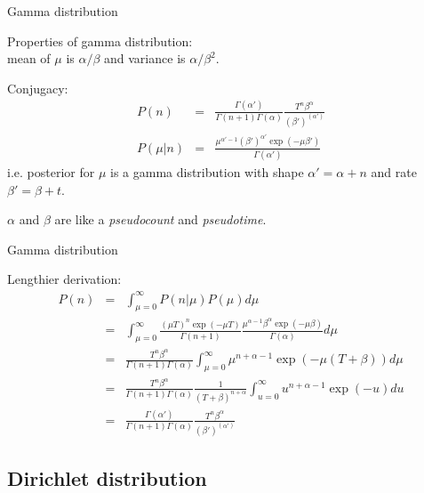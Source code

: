 \documentclass{beamer}
\begin{document}
\begin{frame}{Gamma distribution}

\itemb
 \item Properties of gamma distribution: \\ mean of $\mu$ is $\alpha/\beta$ and variance is $\alpha/\beta^2$.
 \item Conjugacy:
\begin{eqnarray*}
P(n) & = & \frac{\Gamma(\alpha')}{\Gamma(n+1)\Gamma(\alpha)} \frac{T^n \beta^\alpha}{(\beta')^{(\alpha')}} \\
P(\mu|n) & = & \frac{\mu^{\alpha'-1} (\beta')^{\alpha'} \exp(-\mu \beta')}{\Gamma(\alpha')}
\end{eqnarray*}
i.e. posterior for $\mu$ is a gamma distribution with shape $\alpha' = \alpha + n$ and rate $\beta' = \beta + t$.
\item $\alpha$ and $\beta$ are like a {\em pseudocount} and {\em pseudotime}.
\iteme


\end{frame}


\begin{frame}{Gamma distribution}

\itemb
 \item Lengthier derivation:
\begin{eqnarray*}
P(n) & = & \int_{\mu=0}^\infty P(n|\mu) P(\mu) d\mu \\
& = & \int_{\mu=0}^\infty \frac{(\mu T)^n \exp(-\mu T)}{\Gamma(n+1)} \frac{\mu^{\alpha-1} \beta^\alpha \exp(-\mu \beta)}{\Gamma(\alpha)} d\mu \\
& = & \frac{T^n \beta^\alpha}{\Gamma(n+1)\Gamma(\alpha)} \int_{\mu=0}^\infty \mu^{n+\alpha-1} \exp(-\mu (T+\beta)) d\mu \\
& = & \frac{T^n \beta^\alpha}{\Gamma(n+1)\Gamma(\alpha)} \frac{1}{(T+\beta)^{n+\alpha}} \int_{u=0}^\infty u^{n+\alpha-1} \exp(-u) du \\
& = & \frac{\Gamma(\alpha')}{\Gamma(n+1)\Gamma(\alpha)} \frac{T^n \beta^\alpha}{(\beta')^{(\alpha')}}
\end{eqnarray*}
\iteme

\end{frame}

\subsection{Dirichlet distribution}
\end{document}
